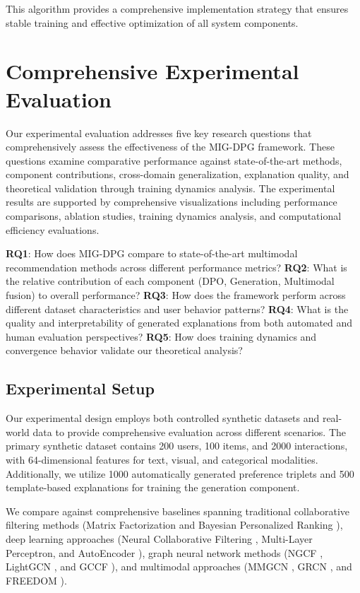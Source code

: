 \documentclass[pdflatex,sn-mathphys-num]{sn-jnl}%
\theoremstyle{thmstyleone}%
\theoremstyle{thmstyletwo}%
\theoremstyle{thmstylethree}%
\begin{document}
This algorithm provides a comprehensive implementation strategy that ensures stable training and effective optimization of all system components.

\section{Comprehensive Experimental Evaluation}\label{sec:experiments}

Our experimental evaluation addresses five key research questions that comprehensively assess the effectiveness of the MIG-DPG framework. These questions examine comparative performance against state-of-the-art methods, component contributions, cross-domain generalization, explanation quality, and theoretical validation through training dynamics analysis. The experimental results are supported by comprehensive visualizations including performance comparisons, ablation studies, training dynamics analysis, and computational efficiency evaluations.

\textbf{RQ1}: How does MIG-DPG compare to state-of-the-art multimodal recommendation methods across different performance metrics? \textbf{RQ2}: What is the relative contribution of each component (DPO, Generation, Multimodal fusion) to overall performance? \textbf{RQ3}: How does the framework perform across different dataset characteristics and user behavior patterns? \textbf{RQ4}: What is the quality and interpretability of generated explanations from both automated and human evaluation perspectives? \textbf{RQ5}: How does training dynamics and convergence behavior validate our theoretical analysis?

\subsection{Experimental Setup}

Our experimental design employs both controlled synthetic datasets and real-world data to provide comprehensive evaluation across different scenarios. The primary synthetic dataset contains 200 users, 100 items, and 2000 interactions, with 64-dimensional features for text, visual, and categorical modalities. Additionally, we utilize 1000 automatically generated preference triplets and 500 template-based explanations for training the generation component.

We compare against comprehensive baselines spanning traditional collaborative filtering methods (Matrix Factorization \cite{koren2009matrix} and Bayesian Personalized Ranking \cite{rendle2009bpr}), deep learning approaches (Neural Collaborative Filtering \cite{he2017neural}, Multi-Layer Perceptron, and AutoEncoder \cite{sedhain2015autorec}), graph neural network methods (NGCF \cite{wang2019neural}, LightGCN \cite{he2020lightgcn}, and GCCF \cite{chen2020revisiting}), and multimodal approaches (MMGCN \cite{wei2019mmgcn}, GRCN \cite{wei2020graph}, and FREEDOM \cite{wei2022freedom}).
\end{document}
